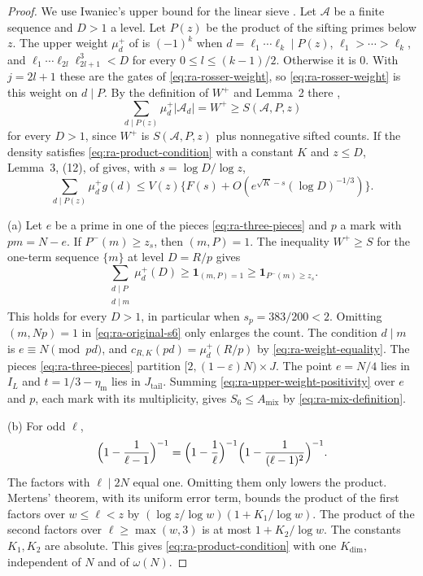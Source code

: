 \begin{proof}
We use Iwaniec's upper bound for the linear sieve
\cite{Iwaniec1980Remainder}. Let \(\mathcal A\) be a finite sequence and
\(D>1\) a level.
Let \(P(z)\) be the product of the sifting primes below \(z\). The
upper weight \(\mu_d^+\) of \cite[p.~313]{Iwaniec1980Remainder} is
\((-1)^k\) when \(d=\ell_1\cdots\ell_k\mid P(z)\),
\(\ell_1>\cdots>\ell_k\), and
\(\ell_1\cdots\ell_{2l}\ell_{2l+1}^3<D\) for every
\(0\le l\le(k-1)/2\).
Otherwise it is \(0\). With \(j=2l+1\) these are the
gates of \eqref{eq:ra-rosser-weight}, so \eqref{eq:ra-rosser-weight} is
this weight on \(d\mid P\). By the definition of \(W^+\)
\cite[p.~310]{Iwaniec1980Remainder} and Lemma~2 there
\cite[p.~313]{Iwaniec1980Remainder},
\[
 \sum_{d\mid P(z)}\mu_d^+|\mathcal A_d|=W^+\ge S(\mathcal A,P,z)
\]
for every \(D>1\), since \(W^+\) is \(S(\mathcal A,P,z)\) plus nonnegative
sifted counts. If the density satisfies \eqref{eq:ra-product-condition}
with a constant \(K\) and \(z\le D\), Lemma~3, (12), of
\cite[p.~313]{Iwaniec1980Remainder} gives, with \(s=\log D/\log z\),
\[
 \sum_{d\mid P(z)}\mu_d^+g(d)
 \le V(z)\{F(s)+O(e^{\sqrt K-s}(\log D)^{-1/3})\}.
\]

(a) Let \(e\) be a prime in one of the pieces \eqref{eq:ra-three-pieces}
and \(p\) a mark with \(pm=N-e\). If \(P^-(m)\ge z_s\), then
\((m,P)=1\). The inequality \(W^+\ge S\) for the one-term sequence
\(\{m\}\) at level \(D=R/p\) gives
\begin{equation}\label{eq:ra-upper-weight-positivity}
 \sum_{\substack{d\mid P\\d\mid m}}\mu_d^+(D)
   \ge\mathbf1_{(m,P)=1}\ge\mathbf1_{P^-(m)\ge z_s}.
\end{equation}
This holds for every \(D>1\), in particular when \(s_p=383/200<2\).
Omitting \((m,Np)=1\) in \eqref{eq:ra-original-s6} only enlarges the
count. The condition \(d\mid m\) is \(e\equiv N\pmod{pd}\), and
\(c_{R,K}(pd)=\mu_d^+(R/p)\) by \eqref{eq:ra-weight-equality}. The pieces
\eqref{eq:ra-three-pieces} partition \([2,(1-\varepsilon)N)\times J\). The
point \(e=N/4\) lies in \(I_L\) and \(t=1/3-\eta_{\mathrm m}\) lies in
\(J_{\mathrm{tail}}\). Summing \eqref{eq:ra-upper-weight-positivity} over
\(e\) and \(p\), each mark with its multiplicity, gives
\(S_6\le A_{\mathrm{mix}}\) by \eqref{eq:ra-mix-definition}.

(b) For odd \(\ell\),
\[
 \Bigl(1-\frac1{\ell-1}\Bigr)^{-1}
 =\Bigl(1-\frac1\ell\Bigr)^{-1}\Bigl(1-\frac1{(\ell-1)^2}\Bigr)^{-1}.
\]
The factors with \(\ell\mid2N\) equal one.
Omitting them only lowers the product. Mertens' theorem, with its uniform error term, bounds the
product of the first factors over \(w\le\ell<z\) by
\((\log z/\log w)(1+K_1/\log w)\). The product of the second factors
over \(\ell\ge\max(w,3)\) is at most \(1+K_2/\log w\). The constants
\(K_1,K_2\) are absolute. This gives \eqref{eq:ra-product-condition} with one
\(K_{\mathrm{dim}}\), independent of \(N\) and of \(\omega(N)\).


\end{proof}
